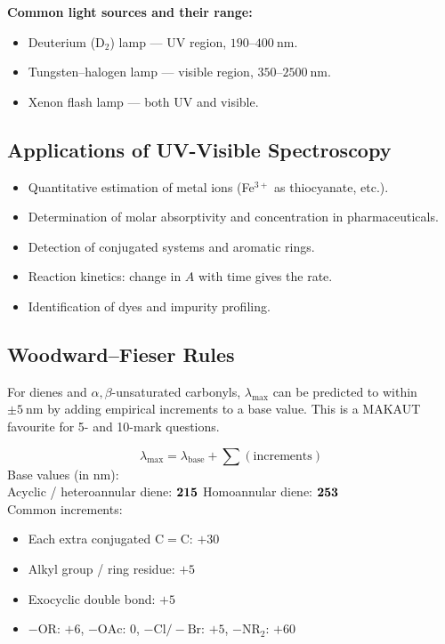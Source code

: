 \documentclass[12pt,a4paper]{article}
\begin{document}
\textbf{Common light sources and their range:}
\begin{itemize}[leftmargin=*, itemsep=1pt, topsep=2pt]
  \item Deuterium ($\mathrm{D_2}$) lamp — UV region, $190$--$400\ \mathrm{nm}$.
  \item Tungsten--halogen lamp — visible region, $350$--$2500\ \mathrm{nm}$.
  \item Xenon flash lamp — both UV and visible.
\end{itemize}

\subsection{Applications of UV-Visible Spectroscopy}
\begin{itemize}[leftmargin=*, itemsep=2pt, topsep=2pt]
  \item Quantitative estimation of metal ions (Fe$^{3+}$ as thiocyanate, etc.).
  \item Determination of molar absorptivity and concentration in pharmaceuticals.
  \item Detection of conjugated systems and aromatic rings.
  \item Reaction kinetics: change in $A$ with time gives the rate.
  \item Identification of dyes and impurity profiling.
\end{itemize}

\subsection{Woodward--Fieser Rules}
For dienes and $\alpha,\beta$-unsaturated carbonyls, $\lambda_{\max}$ can be predicted to within $\pm 5\ \mathrm{nm}$ by adding empirical increments to a base value. This is a MAKAUT favourite for 5- and 10-mark questions.

\begin{tcolorbox}[formulabox, title={Woodward--Fieser Rule for Dienes}]
\[
\lambda_{\max} = \lambda_{\mathrm{base}} + \sum (\text{increments})
\]
Base values (in nm):\\[2pt]
Acyclic / heteroannular diene: $\bf 215$ \quad Homoannular diene: $\bf 253$\\[6pt]
Common increments:
\begin{itemize}[leftmargin=*, itemsep=1pt, topsep=2pt]
  \item Each extra conjugated $\mathrm{C{=}C}$: $+30$
  \item Alkyl group / ring residue: $+5$
  \item Exocyclic double bond: $+5$
  \item $-\mathrm{OR}$: $+6$, $-\mathrm{OAc}$: $0$, $-\mathrm{Cl}/-\mathrm{Br}$: $+5$, $-\mathrm{NR_2}$: $+60$
\end{itemize}
\end{tcolorbox}
\end{document}
